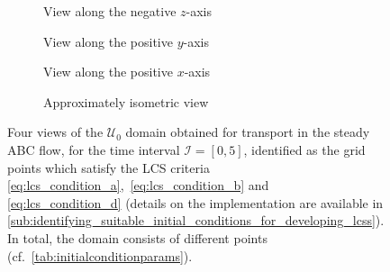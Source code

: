 \begin{figure}[htpb]
    \centering
    \hspace*{\fill}
    \begin{subfigure}[b]{0.43\textwidth}
        \centering
        \caption[]{{\small View along the negative $z$-axis}}
        \label{fig:steady_abd_z}
    \end{subfigure}\hfill%
    \begin{subfigure}[b]{0.43\textwidth}
        \centering
        \caption[]{{\small View along the positive $y$-axis}}
        \label{fig:steady_abd_y}
    \end{subfigure}%
    \hspace*{\fill}

    \hspace*{\fill}
    \begin{subfigure}[b]{0.43\textwidth}
        \centering
        \caption[]{{\small View along the positive $x$-axis}}
        \label{fig:steady_abd_x}
    \end{subfigure}\hfill%
    \begin{subfigure}[b]{0.43\textwidth}
        \centering
        \caption[]{{\small Approximately isometric view}}
        \label{fig:steady_abd_isometric}
    \end{subfigure}%
    \hspace*{\fill}
    \caption[Four views of the $\mathcal{U}_{0}$ domain obtained for transport
    in the steady ABC flow]
    {
        Four views of the $\mathcal{U}_{0}$ domain obtained for transport in the
        steady ABC flow, for the time interval $\mathcal{I}=[0,5]$, identified
        as the grid points which satisfy the LCS criteria
        \eqref{eq:lcs_condition_a},~\eqref{eq:lcs_condition_b} and~
        \eqref{eq:lcs_condition_d} (details on the implementation are available
        in
        \cref{sub:identifying_suitable_initial_conditions_for_developing_lcss}).
        In total, the domain consists of  different points
        (cf.\ \cref{tab:initialconditionparams}).
}
    \label{fig:steady_abd}
\end{figure}


